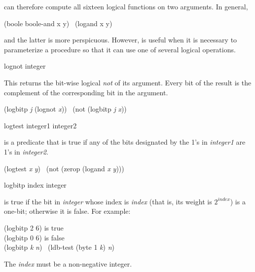 \begin{defun}[Function][Constant]
 can therefore compute all sixteen logical functions on two
arguments.  In general,
\begin{lisp}
(boole boole-and x y) \EQ\ (logand x y)
\end{lisp}
and the latter is more perspicuous.  However,  is useful when it
is necessary to parameterize a procedure so that it can use
one of several logical operations.
\end{defun}

\begin{defun}[Function]
lognot integer

This returns the bit-wise logical \emph{not} of its argument.
Every bit of the result is the complement of the corresponding bit
in the argument.
\begin{lisp}
(logbitp \emph{j} (lognot \emph{x})) \EQ\ (not (logbitp \emph{j} \emph{x}))
\end{lisp}
\end{defun}

\begin{defun}[Function]
logtest integer1 integer2

 is a predicate that is true if any of
the bits designated by the 1's in \emph{integer1} are 1's in \emph{integer2}.
\begin{lisp}
(logtest \emph{x} \emph{y}) \EQ\ (not (zerop (logand \emph{x} \emph{y})))
\end{lisp}
\end{defun}

\begin{defun}[Function]
logbitp index integer

 is true if the bit in \emph{integer} whose index
is \emph{index} (that is, its weight is $2^{index}$) is a one-bit;
otherwise it is false.
For example:
\begin{lisp}
(logbitp 2 6) \textrm{is true} \\
(logbitp 0 6) \textrm{is false} \\
(logbitp \emph{k} \emph{n}) \EQ\ (ldb-test (byte 1 \emph{k}) \emph{n})
\end{lisp}

The \emph{index} must be a non-negative integer.
\end{defun}

